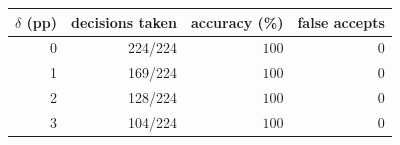 \begin{tabular}{rrrr}
\toprule
$\delta$ (pp) & decisions taken & accuracy (\%) & false accepts \\
\midrule
0 & 224/224 & $100$ & 0 \\
1 & 169/224 & $100$ & 0 \\
2 & 128/224 & $100$ & 0 \\
3 & 104/224 & $100$ & 0 \\
\bottomrule
\end{tabular}

